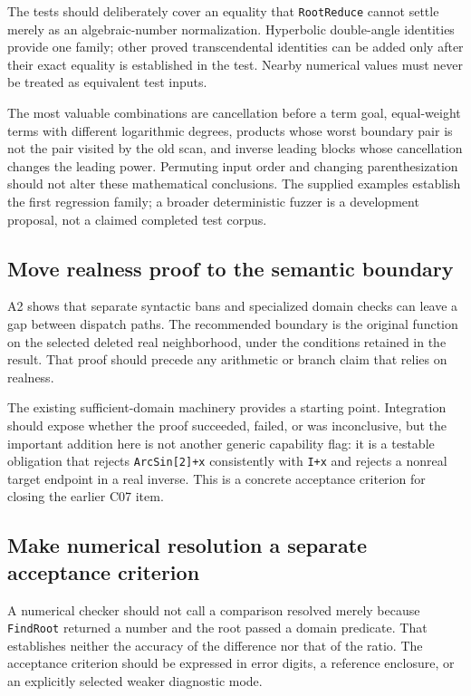 \documentclass[11pt,letterpaper]{article}
\newcommand{\code}[1]{{\small\nolinkurl{#1}}}
\begin{document}
The tests should deliberately cover an equality that \code{RootReduce} cannot settle merely as an algebraic-number normalization. Hyperbolic double-angle identities provide one family; other proved transcendental identities can be added only after their exact equality is established in the test. Nearby numerical values must never be treated as equivalent test inputs.

The most valuable combinations are cancellation before a term goal, equal-weight terms with different logarithmic degrees, products whose worst boundary pair is not the pair visited by the old scan, and inverse leading blocks whose cancellation changes the leading power. Permuting input order and changing parenthesization should not alter these mathematical conclusions. The supplied examples establish the first regression family; a broader deterministic fuzzer is a development proposal, not a claimed completed test corpus.

\subsection{Move realness proof to the semantic boundary}
A2 shows that separate syntactic bans and specialized domain checks can leave a gap between dispatch paths. The recommended boundary is the original function on the selected deleted real neighborhood, under the conditions retained in the result. That proof should precede any arithmetic or branch claim that relies on realness.

The existing sufficient-domain machinery provides a starting point. Integration should expose whether the proof succeeded, failed, or was inconclusive, but the important addition here is not another generic capability flag: it is a testable obligation that rejects \code{ArcSin[2]+x} consistently with \code{I+x} and rejects a nonreal target endpoint in a real inverse. This is a concrete acceptance criterion for closing the earlier C07 item.

\subsection{Make numerical resolution a separate acceptance criterion}
A numerical checker should not call a comparison resolved merely because \code{FindRoot} returned a number and the root passed a domain predicate. That establishes neither the accuracy of the difference nor that of the ratio. The acceptance criterion should be expressed in error digits, a reference enclosure, or an explicitly selected weaker diagnostic mode.
\end{document}
